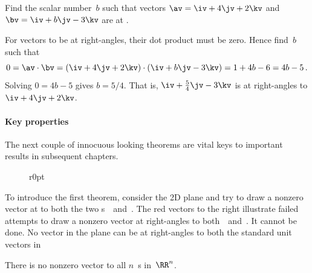 \begin{example} 
Find the scalar number~\(b\) such that vectors \(\av=\iv+4\jv+2\kv\) and \(\bv=\iv+b\jv-3\kv\) are at .
\begin{solution} 
For vectors to be at right-angles, their dot product must be zero.
Hence find~\(b\) such that
\begin{equation*}
0=\av\cdot\bv=(\iv+4\jv+2\kv)\cdot(\iv+b\jv-3\kv)
=1+4b-6=4b-5\,.
\end{equation*}
Solving \(0=4b-5\) gives \(b=5/4\).
That is, \(\iv+\tfrac54\jv-3\kv\) is at right-angles to \(\iv+4\jv+2\kv\).
\end{solution}
\end{example}




\paragraph{Key properties}
The next couple of innocuous looking theorems are vital keys to important results in subsequent chapters.

%
\begin{figure}r{0pt}
\end{figure}
To introduce the first theorem, consider the 2D plane and try to draw a nonzero vector at  to both the two s~\iv\ and~\jv.
The red vectors to the right illustrate failed attempts to draw a nonzero vector at right-angles to both~\iv\ and~\jv.
It cannot be done. 
No vector in the plane can be at right-angles to both the standard unit vectors in 


\begin{theorem} \label{thm:nononz}
There is no nonzero vector  to all \(n\)~s in~\(\RR^n\).
\end{theorem}

